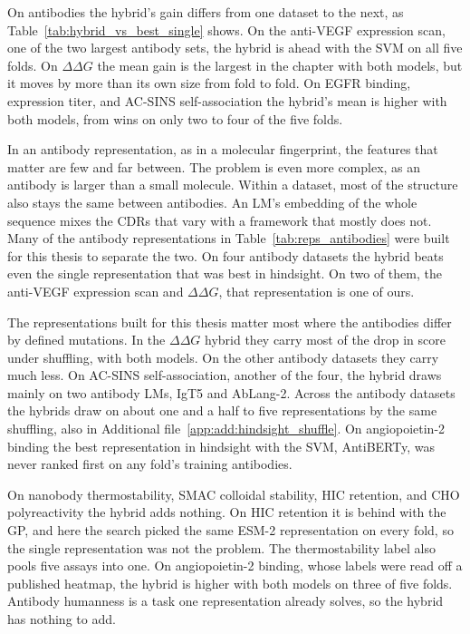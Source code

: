 \begin{table}[htbp]
\label{tab:hybrid_vs_best_single}
\end{table}

On antibodies the hybrid's gain differs from one dataset to the next, as Table~\ref{tab:hybrid_vs_best_single} shows. On the anti-VEGF expression scan, one of the two largest antibody sets, the hybrid is ahead with the SVM on all five folds. On $\Delta\Delta G$ the mean gain is the largest in the chapter with both models, but it moves by more than its own size from fold to fold. On EGFR binding, expression titer, and AC-SINS self-association the hybrid's mean is higher with both models, from wins on only two to four of the five folds.

In an antibody representation, as in a molecular fingerprint, the features that matter are few and far between. The problem is even more complex, as an antibody is larger than a small molecule. Within a dataset, most of the structure also stays the same between antibodies. An LM's embedding of the whole sequence mixes the CDRs that vary with a framework that mostly does not. Many of the antibody representations in Table~\ref{tab:reps_antibodies} were built for this thesis to separate the two. On four antibody datasets the hybrid beats even the single representation that was best in hindsight. On two of them, the anti-VEGF expression scan and $\Delta\Delta G$, that representation is one of ours.

The representations built for this thesis matter most where the antibodies differ by defined mutations. In the $\Delta\Delta G$ hybrid they carry most of the drop in score under shuffling, with both models. On the other antibody datasets they carry much less. On AC-SINS self-association, another of the four, the hybrid draws mainly on two antibody LMs, IgT5 and AbLang-2. Across the antibody datasets the hybrids draw on about one and a half to five representations by the same shuffling, also in Additional file~\ref{app:add:hindsight_shuffle}. On angiopoietin-2 binding the best representation in hindsight with the SVM, AntiBERTy, was never ranked first on any fold's training antibodies.

On nanobody thermostability, SMAC colloidal stability, HIC retention, and CHO polyreactivity the hybrid adds nothing. On HIC retention it is behind with the GP, and here the search picked the same ESM-2 representation on every fold, so the single representation was not the problem. The thermostability label also pools five assays into one.
On angiopoietin-2 binding, whose labels were read off a published heatmap, the hybrid is higher with both models on three of five folds. Antibody humanness is a task one representation already solves, so the hybrid has nothing to add.

